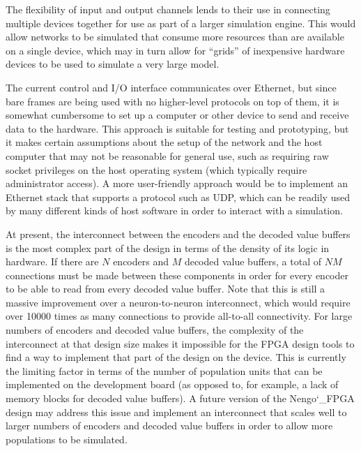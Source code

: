 \documentclass[english]{article}
\newcommand{\design}{Nengo\char`_FPGA}  %
\begin{document}
The flexibility of input and output channels lends to their use in connecting multiple devices together for use as part of a larger simulation engine.
This would allow networks to be simulated that consume more resources than are available on a single device, which may in turn allow
for ``grids'' of inexpensive hardware devices to be used to simulate a very large model.

The current control and I/O interface communicates over Ethernet, but since bare frames are being used with no higher-level protocols on top of them,
it is somewhat cumbersome to set up a computer or other device to send and receive data to the hardware.
This approach is suitable for testing and prototyping, but it makes certain assumptions about the setup of the network and the host computer that
may not be reasonable for general use, such as requiring raw socket privileges on the host operating system (which typically require administrator access).
A more user-friendly approach would be to implement an Ethernet stack that supports a protocol such as UDP, which can be readily used by many different
kinds of host software in order to interact with a simulation.

At present, the interconnect between the encoders and the decoded value
buffers is the most complex part of the design in terms of the density of its logic
in hardware. If there are $N$ encoders and $M$ decoded value buffers, a total of
$NM$ connections must be made between these components in order for every
encoder to be able to read from every decoded value buffer.
Note that this is still a massive improvement over a neuron-to-neuron interconnect,
which would require over 10000 times as many connections to provide all-to-all connectivity.
For large numbers of encoders and decoded value buffers, the complexity of the interconnect at
that design size makes it impossible for the FPGA design tools to find a way to
implement that part of the design on the device. This is currently the limiting
factor in terms of the number of population units that can be implemented on
the development board (as opposed to, for example, a lack of memory blocks for
decoded value buffers). A future version of the \design{} design may address
this issue and implement an interconnect that scales well to larger numbers of
encoders and decoded value buffers in order to allow more populations to be
simulated. %
\end{document}
